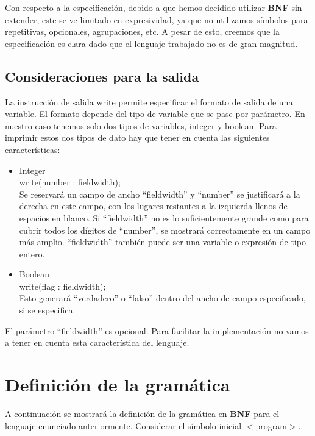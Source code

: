 Con respecto a la especificación, debido a que hemos decidido utilizar {\bf BNF} sin extender, este se ve limitado en expresividad, ya que no utilizamos símbolos para  repetitivas, opcionales, agrupaciones, etc. A pesar de esto, creemos que la especificación es clara dado que el lenguaje trabajado no es de gran magnitud.

\subsection{Consideraciones para la salida}
\label{sec:cons_salida}
La instrucción de salida write permite especificar el formato de salida de una variable. El formato depende del tipo de variable que se pase por parámetro. En nuestro caso tenemos solo dos tipos de variables, integer y boolean. Para imprimir estos dos tipos de dato hay que tener en cuenta las siguientes características:

\begin{itemize}
\item{Integer}\\
write(number : fieldwidth);\\
Se reservará un campo de ancho ``fieldwidth'' y ``number'' se justificará a la derecha en este campo, con los lugares restantes a la izquierda llenos de espacios en blanco. Si ``fieldwidth'' no es lo suficientemente grande como para cubrir todos los dígitos de ``number'', se mostrará correctamente en un campo más amplio. ``fieldwidth'' también puede ser una variable o expresión de tipo entero.
\item{Boolean}\\
write(flag : fieldwidth);\\
Esto generará ``verdadero'' o ``falso'' dentro del ancho de campo especificado, si se especifica.
\end{itemize}

El parámetro ``fieldwidth'' es opcional. Para facilitar la implementación no vamos a tener en cuenta esta característica del lenguaje.

\section{Definición de la gramática}
\label{sec:definicion_gramatica}
A continuación se mostrará la definición de la gramática en \textbf{BNF} para el lenguaje enunciado anteriormente. Considerar el símbolo inicial $<$program$>$.


